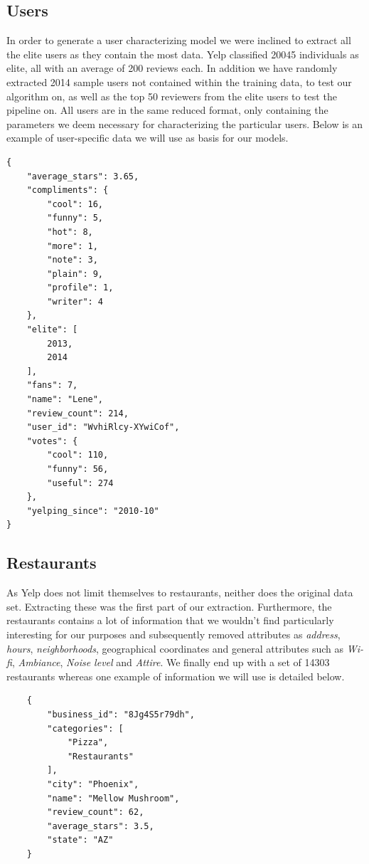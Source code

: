 \documentclass[10pt,twocolumn,letterpaper]{article}
\begin{document}
\subsection{Users}
In order to generate a user characterizing model we were inclined to extract all the elite users as they contain the most data. Yelp classified 20045 individuals as elite, all with an average of 200 reviews each. In addition we have randomly extracted 2014 sample users not contained within the training data, to test our algorithm on, as well as the top 50 reviewers from the elite users to test the pipeline on. All users are in the same reduced format, only containing the parameters we deem necessary for characterizing the particular users. Below is an example of user-specific data we will use as basis for our models.

\begin{verbatim}
{
    "average_stars": 3.65,
    "compliments": {
        "cool": 16,
        "funny": 5,
        "hot": 8,
        "more": 1,
        "note": 3,
        "plain": 9,
        "profile": 1,
        "writer": 4
    },
    "elite": [
        2013,
        2014
    ],
    "fans": 7,
    "name": "Lene",
    "review_count": 214,
    "user_id": "WvhiRlcy-XYwiCof",
    "votes": {
        "cool": 110,
        "funny": 56,
        "useful": 274
    },
    "yelping_since": "2010-10"
}
\end{verbatim}

\subsection{Restaurants}
As Yelp does not limit themselves to restaurants, neither does the original data set. Extracting these was the first part of our extraction. Furthermore, the restaurants contains a lot of information that we wouldn't find particularly interesting for our purposes and subsequently removed attributes as \textit{address}, \textit{hours}, \textit{neighborhoods}, geographical coordinates and general attributes such as \textit{Wi-fi}, \textit{Ambiance}, \textit{Noise level} and \textit{Attire}. We finally end up with a set of 14303 restaurants whereas one example of information we will use is detailed below.

\begin{verbatim}
	{
	    "business_id": "8Jg4S5r79dh",
	    "categories": [
	        "Pizza",
	        "Restaurants"
	    ],
	    "city": "Phoenix",
	    "name": "Mellow Mushroom",
	    "review_count": 62,
	    "average_stars": 3.5,
	    "state": "AZ"
	}
\end{verbatim}
\end{document}
